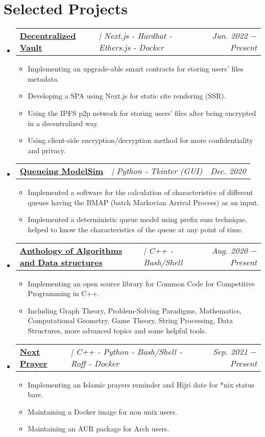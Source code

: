 \documentclass[letterpaper, 11pt]{article}
\makeatletter
\newcommand{\projectItem}[3] {
  \vspace{-1pt}\item
  \begin{tabular*}{0.97\textwidth}[t]{ll@{\extracolsep{\fill}}r}
    \textbf{#1} & \textit{#3} & \textit{\small #2} \\
  \end{tabular*}\vspace{-5pt}
}
\newcommand{\projectSubItem}[1] {\item\small{#1 \vspace{-2pt}}}
\makeatother
\begin{document}
\section{Selected Projects}
\begin{itemize}[leftmargin=*]
  \projectItem{\faIcon{cloud} \href{https://devault.vercel.com}{Decentralized Vault}}{Jun. 2022 $-$ Present}{ | Next.js - Hardhat - Ethers.js - Docker}
  \begin{itemize}
    \projectSubItem{Implementing an upgrade-able smart contracts for storing users' files metadata.}
    \projectSubItem{Developing a SPA using Next.js for static site rendering (SSR).}
    \projectSubItem{Using the IPFS p2p network for storing users' files after being encrypted in a decentralized way.}
    \projectSubItem{Using client-side encryption/decryption method for more confidentiality and privacy.}
  \end{itemize}

  \projectItem{\faIcon{user-clock} \href{https://github.com/AbdeltwabMF/Queueing-ModelSim}{Queueing ModelSim}}{Dec. 2020}{ | Python - Tkinter (GUI)}
  \begin{itemize}
    \projectSubItem{Implemented a software for the calculation of characteristics of different queues having the BMAP (batch Markovian Arrival Process) as an input.}
    \projectSubItem{Implemented a deterministic queue model using prefix sum technique, helped to know the characteristics of the queue at any point of time.}
  \end{itemize}\vspace{-5pt}

  \projectItem{\faIcon{laptop-code} \href{https://github.com/AbdeltwabMF/Anthology-of-Algorithms-and-Data-structures}{Anthology of Algorithms and Data structures}}{Aug. 2020 $-$ Present}{ | C++ - Bash/Shell}
  \begin{itemize}
    \projectSubItem{Implementing an open source library for Common Code for Competitive Programming in C++.}
    \projectSubItem{Including Graph Theory, Problem-Solving Paradigms, Mathematics, Computational Geometry, Game Theory, String Processing, Data Structures, more advanced topics and some helpful tools.}
  \end{itemize}\vspace{-5pt}

  \projectItem{\faIcon{mosque} \href{https://github.com/AbdeltwabMF/nxprayer}{Next Prayer}}{Sep. 2021 $-$ Present}{ | C++ - Python - Bash/Shell - Roff - Docker}
  \begin{itemize}
    \projectSubItem{Implementing an Islamic prayers reminder and Hijri date for *nix status bars.}
    \projectSubItem{Maintaining a Docker image for non unix users.}
    \projectSubItem{Maintaining an AUR package for Arch users.}
  \end{itemize}\vspace{-5pt}
\end{itemize}
\end{document}
